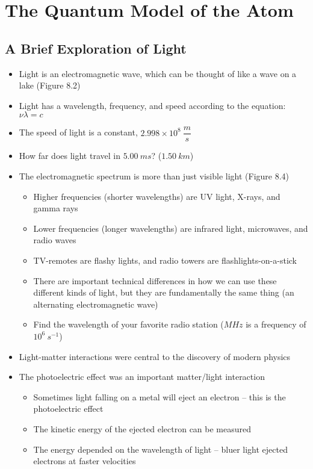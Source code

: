 \documentclass[12pt, openany, letterpaper]{memoir}
\begin{document}
\setcounter{chapter}{7}
\chapter{The Quantum Model of the Atom}
\section{A Brief Exploration of Light}
\begin{itemize}
	\item Light is an electromagnetic wave, which can be thought of like a wave on a lake (Figure 8.2)
	\item Light has a wavelength, frequency, and speed according to the equation: $\nu\lambda=c$
	\item The speed of light is a constant, $2.998\times10^8~\dfrac{m}{s}$
	\item How far does light travel in $5.00~ms$? ($1.50~km$)
	\item The electromagnetic spectrum is more than just visible light (Figure 8.4)
	\begin{itemize}
		\item Higher frequencies (shorter wavelengths) are UV light, X-rays, and gamma rays
		\item Lower frequencies (longer wavelengths) are infrared light, microwaves, and radio waves
		\item TV-remotes are flashy lights, and radio towers are flashlights-on-a-stick
		\item There are important technical differences in how we can use these different kinds of light, but they are fundamentally the same thing (an alternating electromagnetic wave)
		\item Find the wavelength of your favorite radio station ($M\!H\!z$ is a frequency of $10^6~s^{-1}$)
	\end{itemize}
	\item Light-matter interactions were central to the discovery of modern physics
	\item The photoelectric effect was an important matter/light interaction
	\begin{itemize}
		\item Sometimes light falling on a metal will eject an electron -- this is the photoelectric effect
		\item The kinetic energy of the ejected electron can be measured
		\item The energy depended on the wavelength of light -- bluer light ejected electrons at faster velocities

\end{itemize}
\end{itemize}
\end{document}
